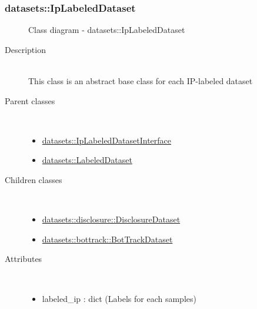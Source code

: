 \subsubsection[IpLabeledDataset]{datasets::IpLabeledDataset}
\begin{figure}[h]
\centering
{}
\caption{Class diagram - datasets::IpLabeledDataset}
\end{figure}\begin{description}
\item[Description] \hfill \\
 This class is an abstract base class for each IP-labeled dataset
\item[Parent classes] \hfill \\
 \vspace{-1cm}
\begin{itemize}
\item \hyperlink{datasets::IpLabeledDatasetInterface}{datasets::IpLabeledDatasetInterface}
\item \hyperlink{datasets::LabeledDataset}{datasets::LabeledDataset}
\end{itemize}

\item[Children classes] \hfill \\
 \vspace{-1cm}
\begin{itemize}
\item \hyperlink{datasets::disclosure::DisclosureDataset}{datasets::disclosure::DisclosureDataset}
\item \hyperlink{datasets::bottrack::BotTrackDataset}{datasets::bottrack::BotTrackDataset}
\end{itemize}

\item[Attributes] \hfill \\
 \vspace{-1cm}
\begin{itemize}
\item labeled\_ip : dict (Labels for each samples)
\end{itemize}


\end{description}
